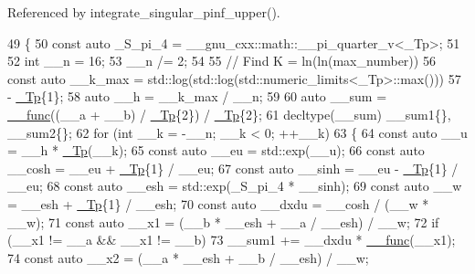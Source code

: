 Referenced by integrate\+\_\+singular\+\_\+pinf\+\_\+upper().


\begin{DoxyCode}
49     \{
50       \textcolor{keyword}{const} \textcolor{keyword}{auto} \_S\_pi\_4 = \_\_gnu\_cxx::math::\_\_pi\_quarter\_v<\_Tp>;
51 
52       \textcolor{keywordtype}{int} \_\_n = 16;
53       \_\_n /= 2;
54 
55       \textcolor{comment}{// Find K = ln(ln(max\_number))}
56       \textcolor{keyword}{const} \textcolor{keyword}{auto} \_\_k\_max = std::log(std::log(std::numeric\_limits<\_Tp>::max()))
57                 - \hyperlink{namespace____gnu__cxx_a3b19a9c800ca194374ef9172290f7d79}{\_Tp}\{1\};
58       \textcolor{keyword}{auto} \_\_h = \_\_k\_max / \_\_n;
59 
60       \textcolor{keyword}{auto} \_\_sum = \hyperlink{namespace____gnu__cxx_af2b2f0c7a2ae72b922b1afefae5a65b2}{\_\_func}((\_\_a + \_\_b) / \hyperlink{namespace____gnu__cxx_a3b19a9c800ca194374ef9172290f7d79}{\_Tp}\{2\}) / \hyperlink{namespace____gnu__cxx_a3b19a9c800ca194374ef9172290f7d79}{\_Tp}\{2\};
61       decltype(\_\_sum) \_\_sum1\{\}, \_\_sum2\{\};
62       \textcolor{keywordflow}{for} (\textcolor{keywordtype}{int} \_\_k = -\_\_n; \_\_k < 0; ++\_\_k)
63         \{
64           \textcolor{keyword}{const} \textcolor{keyword}{auto} \_\_u = \_\_h * \hyperlink{namespace____gnu__cxx_a3b19a9c800ca194374ef9172290f7d79}{\_Tp}(\_\_k);
65           \textcolor{keyword}{const} \textcolor{keyword}{auto} \_\_eu = std::exp(\_\_u);
66           \textcolor{keyword}{const} \textcolor{keyword}{auto} \_\_cosh = \_\_eu + \hyperlink{namespace____gnu__cxx_a3b19a9c800ca194374ef9172290f7d79}{\_Tp}\{1\} / \_\_eu;
67           \textcolor{keyword}{const} \textcolor{keyword}{auto} \_\_sinh = \_\_eu - \hyperlink{namespace____gnu__cxx_a3b19a9c800ca194374ef9172290f7d79}{\_Tp}\{1\} / \_\_eu;
68           \textcolor{keyword}{const} \textcolor{keyword}{auto} \_\_esh = std::exp(\_S\_pi\_4 * \_\_sinh);
69           \textcolor{keyword}{const} \textcolor{keyword}{auto} \_\_w = \_\_esh + \hyperlink{namespace____gnu__cxx_a3b19a9c800ca194374ef9172290f7d79}{\_Tp}\{1\} / \_\_esh;
70           \textcolor{keyword}{const} \textcolor{keyword}{auto} \_\_dxdu = \_\_cosh / (\_\_w * \_\_w);
71           \textcolor{keyword}{const} \textcolor{keyword}{auto} \_\_x1 = (\_\_b * \_\_esh + \_\_a / \_\_esh) / \_\_w;
72           \textcolor{keywordflow}{if} (\_\_x1 != \_\_a && \_\_x1 != \_\_b) 
73             \_\_sum1 += \_\_dxdu * \hyperlink{namespace____gnu__cxx_af2b2f0c7a2ae72b922b1afefae5a65b2}{\_\_func}(\_\_x1);
74           \textcolor{keyword}{const} \textcolor{keyword}{auto} \_\_x2 = (\_\_a * \_\_esh + \_\_b / \_\_esh) / \_\_w;

\end{DoxyCode}
